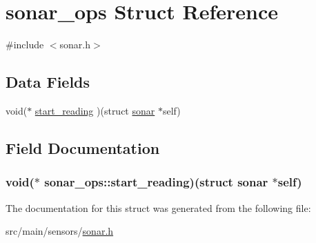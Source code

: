 \hypertarget{structsonar__ops}{\section{sonar\+\_\+ops Struct Reference}
\label{structsonar__ops}
}


{\ttfamily \#include $<$sonar.\+h$>$}

\subsection*{Data Fields}
\begin{DoxyCompactItemize}
\item 
void($\ast$ \hyperlink{structsonar__ops_ad557c4edc26f7345c22a3de4e806bddf}{start\+\_\+reading} )(struct \hyperlink{structsonar}{sonar} $\ast$self)
\end{DoxyCompactItemize}


\subsection{Field Documentation}
\hypertarget{structsonar__ops_ad557c4edc26f7345c22a3de4e806bddf}{
\subsubsection[{start\+\_\+reading}]{\setlength{\rightskip}{0pt plus 5cm}void($\ast$ sonar\+\_\+ops\+::start\+\_\+reading)(struct {\bf sonar} $\ast$self)}}\label{structsonar__ops_ad557c4edc26f7345c22a3de4e806bddf}


The documentation for this struct was generated from the following file\+:\begin{DoxyCompactItemize}
\item 
src/main/sensors/\hyperlink{sonar_8h}{sonar.\+h}\end{DoxyCompactItemize}
